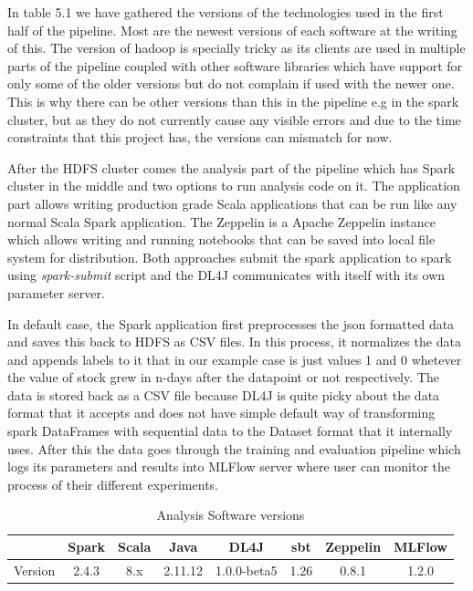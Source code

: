In table 5.1 we have gathered the versions of the technologies used in the first half of the pipeline.
Most are the newest versions of each software at the writing of this.
The version of hadoop is specially tricky as its clients are used in multiple parts of the pipeline coupled with other software libraries which have support for only some of the older versions but do not complain if used with the newer one.
This is why there can be other versions than this in the pipeline e.g in the spark cluster, but as they do not currently cause any visible errors and due to the time constraints that this project has, the versions can mismatch for now.

After the HDFS cluster comes the analysis part of the pipeline which has Spark cluster in the middle and two options to run analysis code on it.
The application part allows writing production grade Scala applications that can be run like any normal Scala Spark application.
The Zeppelin is a Apache Zeppelin instance which allows writing and running notebooks that can be saved into local file system for distribution.
Both approaches submit the spark application to spark using \emph{spark-submit} script and the DL4J communicates with itself with its own parameter server.

In default case, the Spark application first preprocesses the json formatted data and saves this back to HDFS as CSV files.
In this process, it normalizes the data and appends labels to it that in our example case is just values 1 and 0 whetever the value of stock grew in n-days after the datapoint or not respectively.
The data is stored back as a CSV file because DL4J is quite picky about the data format that it accepts and does not have simple default way of transforming spark DataFrames with sequential data to the Dataset format that it internally uses.
After this the data goes through the training and evaluation pipeline which logs its parameters and results into MLFlow server where user can monitor the process of their different experiments.

\begin{table}[! htbp]\centering
    \caption{Analysis Software versions}
    \begin{threeparttable}
        \begin{tabular}{|c|c|c|c|c|c|c|c|} 
        \hline
        & Spark & Scala & Java & DL4J & sbt & Zeppelin & MLFlow \\ \hline
        Version & 2.4.3 & 8.x & 2.11.12 & 1.0.0-beta5 & 1.26 & 0.8.1 & 1.2.0\\
        \hline
        \end{tabular}
    \end{threeparttable}
\end{table}

